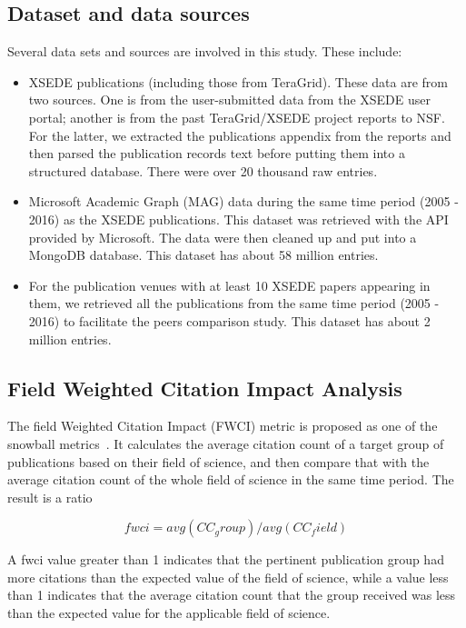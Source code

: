 \documentclass{sig-alternate}
\begin{document}
\subsection{Dataset and data sources}

Several data sets and sources are involved in this study. These
include:

\begin{itemize}
\item XSEDE publications (including those from TeraGrid). These data
  are from two sources. One is from the user-submitted data from the
  XSEDE user portal; another is from the past TeraGrid/XSEDE project
  reports to NSF. For the latter, we extracted the publications
  appendix from the reports and then parsed the publication records
  text before putting them into a structured database. There were over
  20 thousand raw entries.
\item Microsoft Academic Graph (MAG) data during the same time period
  (2005 - 2016) as the XSEDE publications. This dataset was retrieved
  with the API provided by Microsoft. The data were then cleaned up
  and put into a MongoDB database. This dataset has about 58 million
  entries.
\item For the publication venues with at least 10 XSEDE papers
  appearing in them, we retrieved all the publications from the same
  time period (2005 - 2016) to facilitate the peers comparison
  study. This dataset has about 2 million entries.
\end{itemize}

\subsection{Field Weighted Citation Impact Analysis}

The field Weighted Citation Impact (FWCI) metric is proposed as one of
the snowball metrics~\cite{colledge2014snowball}. It calculates the
average citation count of a target group of publications based on
their field of science, and then compare that with the average
citation count of the whole field of science in the same time
period. The result is a ratio

\[	fwci = avg(CC_group)/avg(CC_field) \]

A fwci value greater than 1 indicates that the pertinent publication
group had more citations than the expected value of the field of
science, while a value less than 1 indicates that the average citation
count that the group received was less than the expected value for the
applicable field of science.
\end{document}
